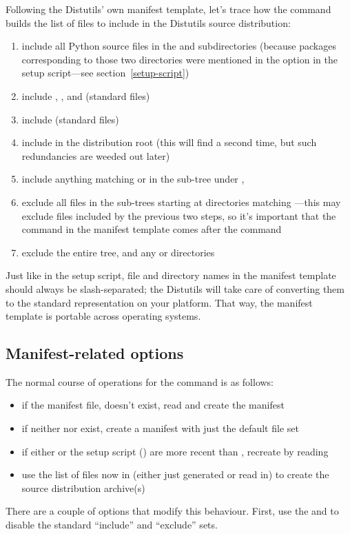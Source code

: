 \documentclass{howto}
\begin{document}
Following the Distutils' own manifest template, let's trace how the
 command builds the list of files to include in the
Distutils source distribution:
\begin{enumerate}
\item include all Python source files in the  and
   subdirectories (because packages
  corresponding to those two directories were mentioned in the
   option in the setup script---see
  section~\ref{setup-script})
\item include , , and 
  (standard files)
\item include  (standard files)
\item include  in the distribution root (this will find
   a second time, but such redundancies are weeded out
  later)
\item include anything matching  or  in the
  sub-tree under ,
\item exclude all files in the sub-trees starting at directories
  matching ---this may exclude files
  included by the previous two steps, so it's important that the
   command in the manifest template comes after the
   command
\item exclude the entire  tree, and any  or
   directories
\end{enumerate}
Just like in the setup script, file and directory names in the manifest
template should always be slash-separated; the Distutils will take care
of converting them to the standard representation on your platform.
That way, the manifest template is portable across operating systems.


\subsection{Manifest-related options}
\label{manifest-options}

The normal course of operations for the  command is as
follows:
\begin{itemize}
\item if the manifest file,  doesn't exist, read
   and create the manifest
\item if neither  nor  exist, create a
  manifest with just the default file set
\item if either  or the setup script ()
  are more recent than , recreate  by
  reading 
\item use the list of files now in  (either just
  generated or read in) to create the source distribution archive(s)
\end{itemize}
There are a couple of options that modify this behaviour.  First, use
the  and  to
disable the standard ``include'' and ``exclude'' sets.
\end{document}
